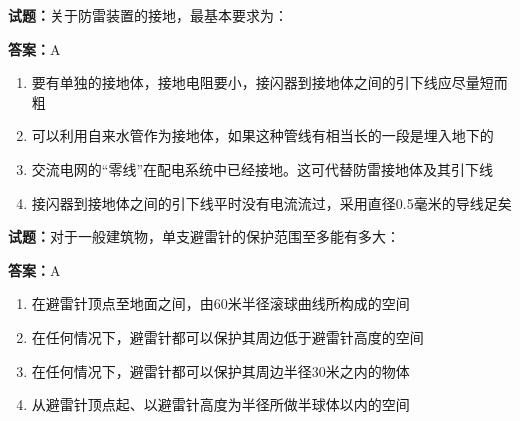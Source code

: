 \documentclass{ctexbook}
\begin{document}




\vspace{1em}

\textbf{试题：}关于防雷装置的接地，最基本要求为： 


\textbf{答案：}A 

\begin{enumerate}[leftmargin=3em]
  \item 要有单独的接地体，接地电阻要小，接闪器到接地体之间的引下线应尽量短而粗 

  \item 可以利用自来水管作为接地体，如果这种管线有相当长的一段是埋入地下的 

  \item 交流电网的“零线”在配电系统中已经接地。这可代替防雷接地体及其引下线 

  \item 接闪器到接地体之间的引下线平时没有电流流过，采用直径0.5毫米的导线足矣 

\end{enumerate}





\vspace{1em}

\textbf{试题：}对于一般建筑物，单支避雷针的保护范围至多能有多大： 

\textbf{答案：}A 

\begin{enumerate}[leftmargin=3em]
  \item 在避雷针顶点至地面之间，由60米半径滚球曲线所构成的空间 

  \item 在任何情况下，避雷针都可以保护其周边低于避雷针高度的空间 

  \item 在任何情况下，避雷针都可以保护其周边半径30米之内的物体 

  \item 从避雷针顶点起、以避雷针高度为半径所做半球体以内的空间 

\end{enumerate}





\vspace{1em}
\end{document}
